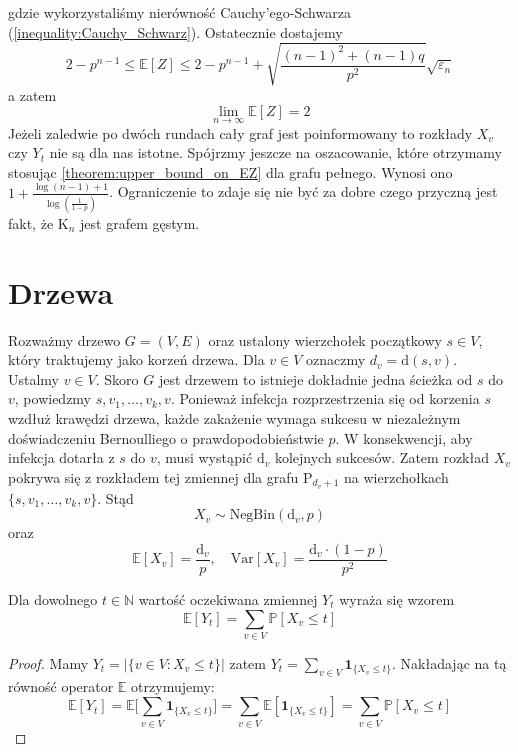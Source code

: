 gdzie wykorzystaliśmy nierówność Cauchy’ego-Schwarza (\ref{inequality:Cauchy_Schwarz}). Ostatecznie dostajemy 
\[
    2-p^{n-1}\le \mathbb{E}[Z] \le 2 - p^{n-1} + \sqrt{\frac{{(n-1)}^2+(n-1)q}{p^2}}\sqrt{\varepsilon_n}
\]
a zatem
\[
    \lim_{n \to \infty} \mathbb{E}[Z] = 2
\]
Jeżeli zaledwie po dwóch rundach cały graf jest poinformowany to rozkłady $X_v$ czy $Y_t$ nie są dla nas istotne. Spójrzmy jeszcze na oszacowanie, które otrzymamy stosując \cref{theorem:upper_bound_on_EZ} dla grafu pełnego. Wynosi ono $1 + \frac{\log(n-1) + 1}{\log(\frac{1}{1-p})}$. Ograniczenie to zdaje się nie być za dobre czego przyczną jest fakt, że $\mathrm{K}_n$ jest grafem gęstym.

\section{Drzewa}

Rozważmy drzewo $G = (V, E)$ oraz ustalony wierzchołek początkowy $s \in V$, 
który traktujemy jako korzeń drzewa. Dla $v\in V$ oznaczmy  $d_v=\mathrm{d}(s,v)$. Ustalmy $v\in V$. Skoro $G$ jest drzewem to istnieje dokładnie jedna ścieżka od $s$ do $v$, powiedzmy $s,v_1,\dots,v_k, v$. Ponieważ infekcja rozprzestrzenia się od korzenia $s$ wzdłuż krawędzi drzewa, 
każde zakażenie wymaga sukcesu w niezależnym doświadczeniu Bernoulliego o prawdopodobieństwie $p$.
W konsekwencji, aby infekcja dotarła z $s$ do $v$, 
musi wystąpić $\mathrm{d}_v$ kolejnych sukcesów. Zatem rozkład $X_v$ pokrywa się z rozkładem tej zmiennej dla grafu $\mathrm{P}_{d_v+1}$ na wierzchołkach $\{s,v_1,\dots,v_k, v\}$. Stąd 
\[
    X_v\sim \mathrm{NegBin}(\mathrm{d}_v,p)
\]
oraz
\[
    \mathbb{E}[X_v] = \frac{\mathrm{d}_v}{p}, \quad \mathrm{Var}[X_v] = \frac{\mathrm{d}_v\cdot(1 - p)}{p^2}
\]
\begin{lemma}\label{lemma:Formula_EYt}
Dla dowolnego $t\in\mathbb{N}$ wartość oczekiwana zmiennej $Y_t$ wyraża się wzorem
\[
    \mathbb{E}[Y_t] = \sum_{v\in V} \mathbb{P}[X_v \le t]
\]    
\end{lemma}

\begin{proof}
Mamy $Y_t=|\{v\in V: X_v \le t\}|$ zatem $Y_t=\sum_{v\in V}  \mathbf{1}_{\{X_v\le t\}}$. Nakładając na tą równość operator $\mathbb{E}$ otrzymujemy:
\[
    \mathbb{E}[Y_t] = \mathbb{E}\Big[ \sum_{v\in V}  \mathbf{1}_{\{X_v\le t\}}\Big]= \sum_{v\in V} \mathbb{E}[\mathbf{1}_{\{X_v\le t\}}] = \sum_{v\in V} \mathbb{P}[X_v \le t]
\]    
\end{proof}

